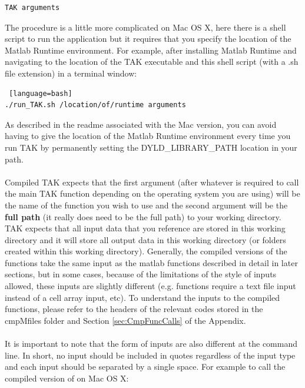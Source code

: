 \begin{lstlisting}[language=bash]
TAK arguments
\end{lstlisting}

\noindent
The procedure is a little more complicated on Mac OS X, here there is a shell script to run the application but it requires that you specify the location of the Matlab Runtime environment. For example, after installing Matlab Runtime and navigating to the location of the TAK executable and this shell script (with a .sh file extension) in a terminal window:

\begin{lstlisting} [language=bash]
./run_TAK.sh /location/of/runtime arguments
\end{lstlisting}

\noindent
As described in the readme associated with the Mac version, you can avoid having to give the location of the Matlab Runtime environment every time you run TAK by permanently setting the DYLD\_LIBRARY\_PATH location in your path.

\paragraph{}Compiled TAK expects that the first argument (after whatever is required to call the main TAK function depending on the operating system you are using) will be the name of the function you wish to use  and the second argument will be the \textbf{full path} (it really does need to be the full path) to your working directory. TAK expects that all input data that you reference are stored in this working directory and it will store all output data in this working directory (or folders created within this working directory). Generally, the compiled versions of the functions take the same input as the matlab functions described in detail in later sections, but in some cases, because of the limitations of the style of inputs allowed, these inputs are slightly different (e.g. functions require a text file input instead of a cell array input, etc). To understand the inputs to the compiled functions, please refer to the headers of the relevant codes stored in the cmpMfiles folder and Section \ref{sec:CmpFuncCalls} of the Appendix. 

\paragraph{}It is important to note that the form of inputs are also different at the command line. In short, no input should be included in quotes regardless of the input type and each input should be separated by a single space. For example to call the compiled version of  on Mac OS X:

